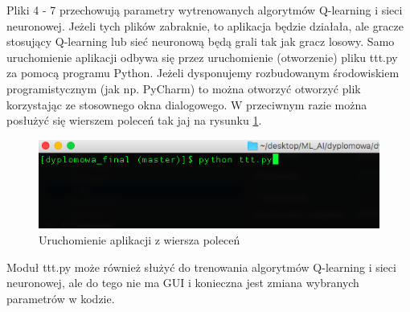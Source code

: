 \documentclass[licencjacka]{pracamgr}
\begin{document}
Pliki 4 - 7 przechowują parametry wytrenowanych algorytmów Q-learning i sieci neuronowej. Jeżeli tych plików zabraknie, to aplikacja będzie działała, ale gracze stosujący Q-learning lub sieć neuronową będą grali tak jak gracz losowy. Samo uruchomienie aplikacji odbywa się przez uruchomienie (otworzenie) pliku ttt.py za pomocą programu Python. Jeżeli dysponujemy rozbudowanym środowiskiem programistycznym (jak np. PyCharm) to można otworzyć otworzyć plik korzystając ze stosownego okna dialogowego. W przeciwnym razie można posłużyć się wierszem poleceń tak jaj na rysunku \ref{Rys35}. 


\begin{figure}[h!]
	\includegraphics [scale=0.5] {uruchamianie.png}
	\caption{Uruchomienie aplikacji z wiersza poleceń}
	\label{Rys35}
\end{figure} 


Moduł ttt.py może również służyć do trenowania algorytmów Q-learning i sieci neuronowej, ale do tego nie ma GUI i konieczna jest zmiana wybranych parametrów w kodzie. 
\end{document}

